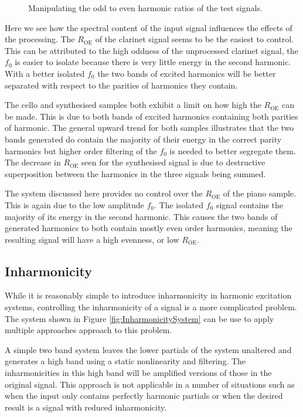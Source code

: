 		\begin{figure}[h!]
			\centering
			\resizebox{0.6\textwidth}{!}{}
			\caption{Manipulating the odd to even harmonic ratios of the test signals.}
			\label{fig:MoveParities}
		\end{figure}

		Here we see how the spectral content of the input signal influences the effects of the processing.  The
		$R_{\textrm{OE}}$ of the clarinet signal seems to be the easiest to control. This can be attributed to the
		high oddness of the unprocessed clarinet signal, the $f_{0}$ is easier to isolate because there is very
		little energy in the second harmonic. With a better isolated $f_{0}$ the two bands of excited harmonics
		will be better separated with respect to the parities of harmonics they contain.

		The cello and synthesised samples both exhibit a limit on how high the $R_{\textrm{OE}}$ can be made. This
		is due to both bands of excited harmonics containing both parities of harmonic.  The general upward trend
		for both samples illustrates that the two bands generated do contain the majority of their energy in the
		correct parity harmonics but higher order filtering of the $f_{0}$ is needed to better segregate them. The
		decrease in $R_{\textrm{OE}}$ seen for the synthesised signal is due to destructive superposition between
		the harmonics in the three signals being summed.

		The system discussed here provides no control over the $R_{\textrm{OE}}$ of the piano sample. This is again
		due to the low amplitude $f_{0}$. The isolated $f_{0}$ signal contains the majority of its energy in the
		second harmonic. This causes the two bands of generated harmonics to both contain mostly even order
		harmonics, meaning the resulting signal will have a high evenness, or low $R_{\textrm{OE}}$.

	\subsection{Inharmonicity}
	\label{sec:FeatureControl-Parameterisation-Inharmonicity}
		While it is reasonably simple to introduce inharmonicity in harmonic excitation systems, controlling the
		inharmonicity of a signal is a more complicated problem. The system shown in Figure
		\ref{fig:InharmonicitySystem} can be use to apply multiple approaches approach to this problem. 

		A simple two band system leaves the lower partials of the system unaltered and generates a high band using
		a static nonlinearity and filtering. The inharmonicities in this high band will be amplified versions of
		those in the original signal. This approach is not applicable in a number of situations such as when the
		input only contains perfectly harmonic partials or when the desired result is a signal with reduced
		inharmonicity.
		

